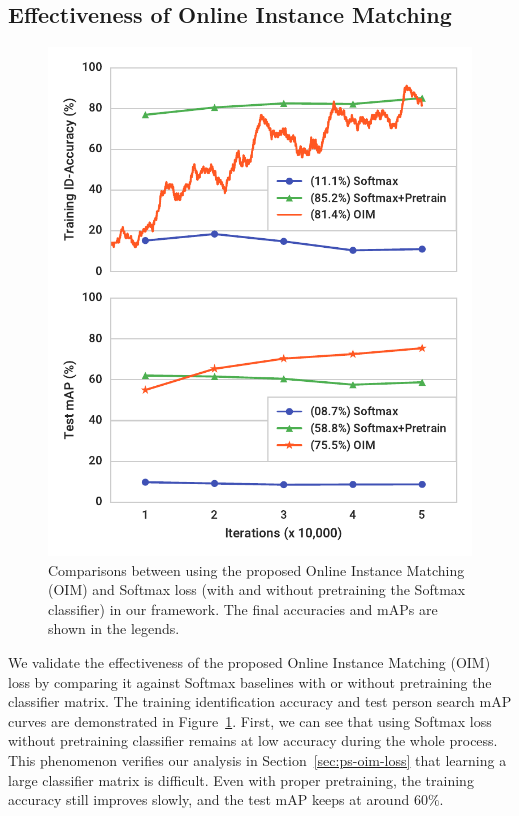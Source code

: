 \subsection{Effectiveness of Online Instance Matching} %
\label{sub:ps-effectiveness-of-online-instance-matching}
\begin{figure}[t]
\begin{center}
\includegraphics[width=1.0\linewidth]{figures/person_search/oim-vs-softmax.pdf}
\end{center}
\caption{Comparisons between using the proposed Online Instance Matching (OIM) and Softmax loss (with and without pretraining the Softmax classifier) in our framework. The final accuracies and mAPs are shown in the legends.}
\label{fig:ps-oim-vs-softmax}
\end{figure}
We validate the effectiveness of the proposed Online Instance Matching (OIM) loss by comparing it against Softmax baselines with or without pretraining the classifier matrix. The training identification accuracy and test person search mAP curves are demonstrated in Figure~\ref{fig:ps-oim-vs-softmax}. First, we can see that using Softmax loss without pretraining classifier remains at low accuracy during the whole process. This phenomenon verifies our analysis in Section~\ref{sec:ps-oim-loss} that learning a large classifier matrix is difficult. Even with proper pretraining, the training accuracy still improves slowly, and the test mAP keeps at around $60\%$.

